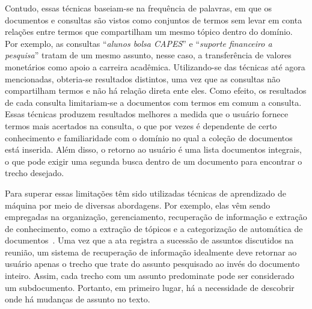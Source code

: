 Contudo, essas técnicas baseiam-se na frequência de palavras, em que os documentos e consultas são vistos como conjuntos de termos sem levar em conta relações entre termos que compartilham um mesmo tópico dentro do domínio. Por exemplo, as consultas ``\textit{alunos bolsa CAPES}'' e ``\textit{suporte financeiro a pesquisa}'' tratam de um mesmo assunto, nesse caso, a transferência de valores monetários como apoio a carreira acadêmica. Utilizando-se das técnicas até agora mencionadas, obteria-se resultados distintos, uma vez que as consultas não compartilham termos e não há relação direta ente eles. Como efeito, os resultados de cada consulta limitariam-se a documentos com termos em comum a consulta.
Essas técnicas produzem resultados melhores a medida que o usuário fornece termos mais acertados na consulta, o que por vezes é dependente de certo conhecimento e familiaridade com o domínio no qual a coleção de documentos está inserida. Além disso, o retorno ao usuário é uma lista documentos integrais, o que pode exigir uma segunda busca dentro de um documento para encontrar o trecho desejado.





Para superar essas limitações têm sido utilizadas técnicas de aprendizado de máquina por meio de diversas abordagens. Por exemplo, elas vêm sendo empregadas na organização, gerenciamento, recuperação de informação e extração de conhecimento, como a extração de tópicos e a categorização de automática de documentos~\cite{Purver2006}. 
% 
% 
Uma vez que a ata registra a sucessão de assuntos discutidos na reunião, um sistema de recuperação de informação idealmente deve retornar ao usuário apenas o trecho que trate do assunto pesquisado ao invés do documento inteiro. Assim, cada trecho com um assunto predominate pode ser considerado um subdocumento. Portanto, em primeiro lugar, há a necessidade de descobrir onde há mudanças de assunto no texto. 





